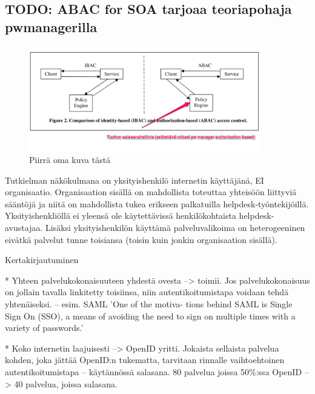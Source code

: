 \documentclass[english,gradu]{tktltiki}
\begin{document}

\subsection{TODO: ABAC for SOA tarjoaa teoriapohaja pwmanagerilla} %
\label{sub:todo_abac_for_soa_tarjoaa_teoriapohaja_pwmanagerilla}


  \begin{figure}
    \centering
    \includegraphics[width=0.9\textwidth]{images/abac_for_soa.jpg}
    \caption{Piirrä oma kuva tästä}
    \label{fig:abac_for_soa}
  \end{figure}
  Tutkielman näkökulmana on yksityishenkilö internetin käyttäjänä, EI organisaatio. Organisaation sisällä on mahdollista toteuttaa yhteisöön liittyviä sääntöjä ja niitä on mahdollista tukea erikseen palkatuilla helpdesk-työntekijöillä. Yksityishenkliöllä ei yleensä ole käytettävissä  henkilökohtaista helpdesk-avustajaa. Lisäksi yksityishenkilön käyttämä palveluvalikoima on heterogeeninen eivätkä palvelut tunne toisiansa (toisin kuin jonkin organisaation sisällä).

  Kertakirjautuminen

  * Yhteen palvelukokonaisuuteen yhdestä ovesta --> toimii. Jos palvelukokonaisuus on jollain tavalla linkitetty toisiinsa, niin autentikoitumistapa voidaan tehdä yhtenäiseksi.
  -- esim. SAML
  'One of the motiva- tions behind SAML is Single Sign On (SSO), a means of avoiding the need to sign on multiple times with a variety of passwords.'

  * Koko internetin laajuisesti --> OpenID yritti. Jokaista sellaista palvelua kohden, joka jättää OpenID:n tukematta, tarvitaan rinnalle vaihtoehtoinen autentikoitumistapa -- käytännössä salasana. 80 palvelua joissa 50\%:ssa OpenID --> 40 palvelua, joissa salasana.
\end{document}

